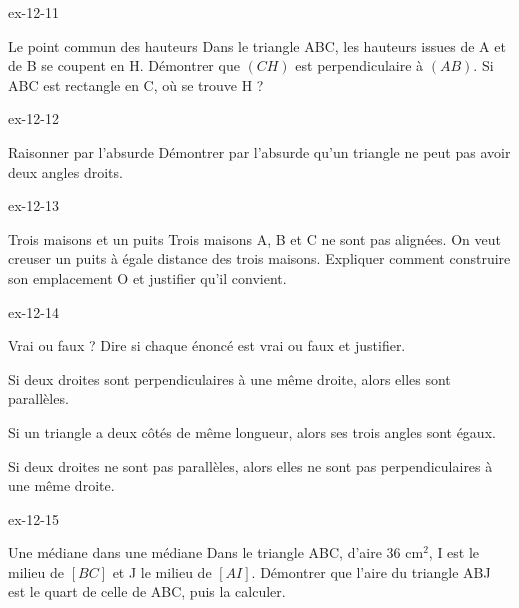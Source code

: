 \begin{blocLivre}{ex-12-11}\begin{exercice}[3]{Le point commun des hauteurs}
Dans le triangle ABC, les hauteurs issues de A et de B se coupent en H. Démontrer que $(CH)$ est perpendiculaire à $(AB)$. Si ABC est rectangle en C, où se trouve H ?
\label{fig-ex-12-11}
\end{exercice}\end{blocLivre}
\begin{blocLivre}{ex-12-12}\begin{exercice}[3]{Raisonner par l’absurde}
Démontrer par l’absurde qu’un triangle ne peut pas avoir deux angles droits.
\label{fig-ex-12-12}
\end{exercice}\end{blocLivre}
\begin{blocLivre}{ex-12-13}\begin{exercice}[3]{Trois maisons et un puits}
Trois maisons A, B et C ne sont pas alignées. On veut creuser un puits à égale distance des trois maisons. Expliquer comment construire son emplacement O et justifier qu’il convient.
\label{fig-ex-12-13}
\end{exercice}\end{blocLivre}
\begin{blocLivre}{ex-12-14}\begin{exercice}[3]{Vrai ou faux ?}
Dire si chaque énoncé est vrai ou faux et justifier.\begin{questions}
\item Si deux droites sont perpendiculaires à une même droite, alors elles sont parallèles.
\item Si un triangle a deux côtés de même longueur, alors ses trois angles sont égaux.
\item Si deux droites ne sont pas parallèles, alors elles ne sont pas perpendiculaires à une même droite.
\end{questions}
\label{fig-ex-12-14}
\end{exercice}\end{blocLivre}
\begin{blocLivre}{ex-12-15}\begin{exercice}[3]{Une médiane dans une médiane}
Dans le triangle ABC, d’aire 36 cm$^2$, I est le milieu de $[BC]$ et J le milieu de $[AI]$. Démontrer que l’aire du triangle ABJ est le quart de celle de ABC, puis la calculer.
\label{fig-ex-12-15}
\end{exercice}\end{blocLivre}

\clearpage
